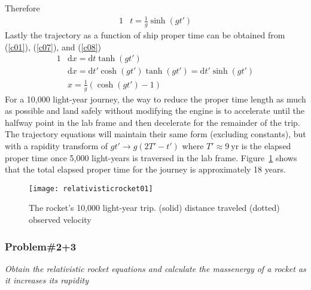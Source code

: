 \documentclass[]{article}
\numberwithin{equation}{subsection}
\begin{document}
Therefore  
\begin{alignat}{1}
	\label{c09}	&t=\frac{1}{g}\sinh(gt')
\end{alignat}
Lastly the trajectory as a function of ship proper time can be obtained from (\ref{c01}), (\ref{c07}), and (\ref{c08})
\begin{alignat}{1}
	\label{c10}	&\mathrm{d} x=\mathrm{d}t\tanh(gt')\\
	\label{c11}	&\mathrm{d} x=\mathrm{d}t'\cosh(gt')\tanh(gt')=\mathrm{d}t'\sinh(gt')\\
	\label{c12}	&x=\frac{1}{g}(\cosh(gt')-1)
\end{alignat}
For a 10,000 light-year journey, the way to reduce the proper time length as much as possible and land safely without modifying the engine is to accelerate until the halfway point in the lab frame and then decelerate for the remainder of the trip. The trajectory equations will maintain their same form (excluding constants), but with a rapidity transform of $gt'\rightarrow g(2T'-t')$ where $T'\approx 9\ \mathrm{yr}$ is the elapsed proper time once 5,000 light-years is traversed in the lab frame. Figure~\ref{fig02} shows that the total elapsed proper time for the journey is approximately 18 years.
\begin{figure}[htbp]
	\centering
	\texttt{[image: relativisticrocket01]}
	\caption{The rocket's 10,000 light-year trip. (solid) distance traveled (dotted) observed velocity}
	\label{fig02}
\end{figure}
\subsubsection*{Problem\#2+3}
\emph{Obtain the relativistic rocket equations and calculate the massenergy of a rocket as it increases its rapidity}\\
\end{document}
